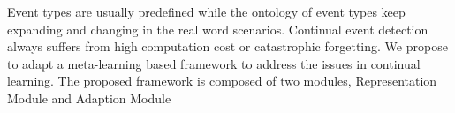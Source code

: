 Event types are usually predefined while the ontology of event types keep expanding and changing in the real word scenarios. Continual event detection always suffers from high computation cost or catastrophic forgetting. We propose to adapt a meta-learning based framework to address the issues in continual learning. The proposed framework is composed of two modules, Representation Module and Adaption Module 